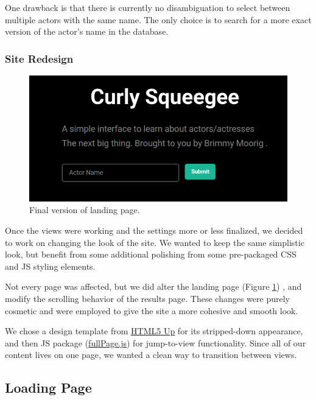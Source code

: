\documentclass[12pt]{article}
\begin{document}
One drawback is that there is currently no disambiguation to select between multiple actors with the same name.  The only choice is to search for a more exact version of the actor's name in the database.

\subsubsection{Site Redesign}


\begin{figure}\label{blackLandingPage}
\centering
\includegraphics[scale=0.3]{images/landingBoxFinal.png}
\caption{Final version of landing page.}
\end{figure}


Once the views were working and the settings more or less finalized, we decided to work on changing the look of the site.  We wanted to keep the same simplistic look, but benefit from some additional polishing from some pre-packaged CSS and JS styling elements. 

Not every page was affected, but we did alter the landing page (Figure \ref{blackLandingPage}) , and modify the scrolling behavior of the results page.  These changes were purely cosmetic and were employed to give the site a more cohesive and smooth look.




We chose a design template from \href{http://html5up.net/}{HTML5 Up} for its stripped-down appearance, and then JS package (\href{http://alvarotrigo.com/fullPage/}{fullPage.js}) for jump-to-view functionality.  Since all of our content lives on one page, we wanted a clean way to transition between views.

\subsection{Loading Page}
\end{document}
